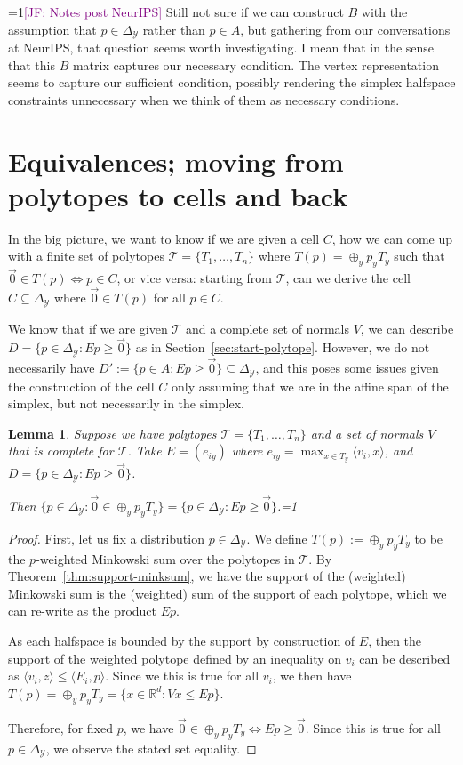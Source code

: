 \documentclass[12pt]{article}
\newcommand{\Comments}{1}
\newcommand{\mynote}[2]{\ifnum\Comments=1\textcolor{#1}{#2}\fi}
\newcommand{\mytodo}[2]{\ifnum\Comments=1%
  \todo[linecolor=#1!80!black,backgroundcolor=#1,bordercolor=#1!80!black]{#2}\fi}
\newcommand{\jessie}[1]{\mynote{purple}{[JF: #1]}}
\newcommand{\btw}[1]{\mytodo{orange!20!white}{BTW: #1}}
\newcommand{\reals}{\mathbb{R}}
\newcommand{\simplex}{\Delta_\Y}
\newcommand{\T}{\mathcal{T}}
\newcommand{\Y}{\mathcal{Y}}
\newcommand{\inprod}[2]{\langle #1, #2 \rangle}%
\newtheorem{lemma}{Lemma}
\begin{document}
  \jessie{Notes post NeurIPS} 
  Still not sure if we can construct $B$ with the assumption that $p \in \simplex$ rather than $p \in A$, but gathering from our conversations at NeurIPS, that question seems worth investigating.
  I mean that in the sense that this $B$ matrix captures our necessary condition.
  The vertex representation seems to capture our sufficient condition, possibly rendering the simplex halfspace constraints unnecessary when we think of them as necessary conditions.

  \section{Equivalences; moving from polytopes to cells and back}
  
  In the big picture, we want to know if we are given a cell $C$, how we can come up with a finite set of polytopes $\T = \{T_1, \ldots, T_n\}$ where $T(p) = \oplus_y p_y T_y$ such that $\vec 0 \in T(p) \iff p \in C$, or vice versa: starting from $\T$, can we derive the cell $C \subseteq \simplex$ where $\vec 0 \in T(p)$ for all $p \in C$.
  
  We know that if we are given $\T$ and a complete set of normals $V$, we can describe $D = \{p \in \simplex : Ep \geq \vec 0\}$ as in Section~\ref{sec:start-polytope}.
  However, we do not necessarily have $D' := \{p \in A : Ep \geq \vec 0\} \subseteq \simplex$, and this poses some issues given the construction of the cell $C$ only assuming that we are in the affine span of the simplex, but not necessarily in the simplex.
  
  \begin{lemma}\label{lem:describe-D}
    Suppose we have polytopes $\T = \{T_1, \ldots, T_n\}$ and a set of normals $V$ that is complete for $\T$.
 	Take $E = (e_{iy})$ where $e_{iy} = \max_{x \in T_y} \inprod{v_i}{x}$, and $D = \{p \in \simplex : Ep \geq \vec 0\}$.
 	
 	Then $\{p \in \simplex : \vec 0 \in \oplus_y p_y T_y\} = \{p \in \simplex: Ep \geq \vec 0\}$.\btw{``stuff about $E$ and $D$.''}
  \end{lemma}
  \begin{proof}
    First, let us fix a distribution $p \in \simplex$.
    We define $T(p) := \oplus_y p_y T_y$ to be the $p$-weighted Minkowski sum over the polytopes in $\T$.
    By Theorem~\ref{thm:support-minksum}, we have the support of the (weighted) Minkowski sum is the (weighted) sum of the support of each polytope, which we can re-write as the product $Ep$.
    
    As each halfspace is bounded by the support by construction of $E$, then the support of the weighted polytope defined by an inequality on $v_i$ can be described as $\inprod{v_i}{z} \leq \inprod{E_i}{p}$.
    Since we this is true for all $v_i$, we then have $T(p) = \oplus_y p_y T_y = \{x \in \reals^d : Vx \leq Ep\}$.
    	
    Therefore, for fixed $p$, we have $\vec 0 \in \oplus_y p_y T_y \iff Ep \geq \vec 0$.
    Since this is true for all $p \in \simplex$, we observe the stated set equality.
  \end{proof}
  
\end{document}
